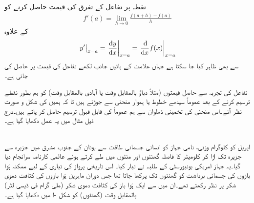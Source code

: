 نقطہ  پر تفاعل  کے تفرق کی قیمت حاصل کرنے کو
\begin{align*}
f'(a)=\lim_{h\to 0}\frac{f(a+h)-f(a)}{h}
\end{align*}
کے علاوہ
\begin{align*}
\left. y' \right \vert_{x=a}=\left. \frac{\dif y}{\dif x} \right\vert_{x=a}=\left. \frac{\dif}{\dif x}f(x) \right\vert_{x=a}
\end{align*}
سے بھی ظاہر کیا جا سکتا ہے جہاں  علامت   کے  بائیں  جانب لکھے تفاعل کی قیمت  پر حاصل کی جاتی ہے۔ 

تفاعل  کی تجربہ سے حاصل قیمتوں (مثلاً دباؤ بالمقابل وقت یا آبادی بالمقابل وقت) کو ہم بطور نقطے ترسیم کرنے کے بعد عموماً سیدھے خطوط یا ہموار منحنی سے جوڑتے ہیں تا کہ ہمیں  کی  شکل و صورت نظر آئے۔اس منحنی کی تخمینی   ڈھلوان سے   ہم عموماً    کی قابل قبول  ترسیم حاصل   کر پاتے ہیں۔درج ذیل مثال میں یہ  عمل  دکھایا گیا ہے۔


\\
 اپریل  کو  کلوگرام وزنی،   نامی جہاز کو انسانی جسمانی طاقت سے   یونان کے جنوب مشرق میں جزیرہ  سے جزیرہ  تک اڑا کر  کلومیٹر  کا فاصلہ  گھنٹوں اور  منٹوں میں طے کرتے ہوئے عالمی کارنامہ سرانجام دیا گیا۔یہ جہاز امریکی یونیورسٹی کے طلبہ نے تیار کیا۔ اس تاریخی پرواز کی تیاری کے لیے ممکنہ ہَوا بازوں کی جسمانی برداشت کو  گھنٹوں تک پرکھا جاتا تھا جس دوران ماہرین ہَوا بازوں  کی کثافت دموی شکر پر نظر رکھتے تھے۔ان میں سے ایک ہَوا باز کی کثافت دموی شکر (ملی گرام فی ڈیسی لٹر) بالمقابل وقت (گھنٹوں) کو شکل -ا میں دکھایا گیا ہے۔

